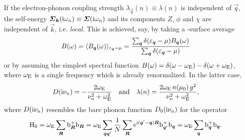If the electron-phonon coupling strength $\lambda_{\vec q}(n) \equiv \lambda(n)$
is independent of $\vec q$, the self-energy $\boldsymbol {\varSigma}_{\boldsymbol k}(\mathrm i \omega_n)
\equiv \boldsymbol {\varSigma}(\mathrm i \omega_n)$ and its components $Z$, $\phi$ and $\chi$ are
independent of $\vec k$, i.e. \emph{local}. This is achieved, say, by taking a
-surface average \cite[Eqs.~3.23, 3.24]{AllenMitrovic82}
%
\begin{equation*}
    B(\omega) = \langle B_{\boldsymbol q}(\omega)\rangle_{\varepsilon_{\boldsymbol q} = \mu}
    = \frac
        {\sum_{\boldsymbol q} \delta(\varepsilon_{\boldsymbol q} - \mu) B_{\boldsymbol q}(\omega)}
        {\sum_{\boldsymbol q} \delta(\varepsilon_{\boldsymbol q} - \mu)}
\end{equation*}
%
or by assuming the simplest spectral function $B(\omega) = \delta(\omega -
\omega \sb{\text{E}}) - \delta(\omega + \omega \sb{\text{E}})$, where $\omega \sb{\text{E}}$ is a
single  frequency which is already renormalized. In the latter
case,
%
\begin{equation*}
    D(\mathrm i \nu_n)
    = -\frac{2 \omega \sb{\text{E}}}{\nu_n^2 + \omega^2 \sb{\text{E}}}
    \quad \text{and} \quad
    \lambda(n)
    = \frac{2 \omega \sb{\text{E}} \, n(\mu_0) \, g^2}{\nu_n^2 + \omega^2 \sb{\text{E}}},
\end{equation*}
%
where $D(\mathrm i \nu_n)$ resembles the bare phonon  function $D_0(\mathrm i
\nu_n)$ for the  operator
%
\begin{equation*}
    \mathrm H_0
    = \omega \sb{\text{E}} \sum_{\boldsymbol R} \mathrm b_{\boldsymbol R}^+ \mathrm b_{\boldsymbol R}
    = \omega \sb{\text{E}} \sum_{\boldsymbol q \boldsymbol q'} \frac 1 N \sum_{\boldsymbol R}
        \mathrm e^{\mathrm i (\boldsymbol q' - \boldsymbol q) \boldsymbol R} \mathrm b_{\boldsymbol q'}^+ \mathrm b_{\boldsymbol q}
    = \omega \sb{\text{E}} \sum_{\boldsymbol q} \mathrm b_{\boldsymbol q}^+ \mathrm b_{\boldsymbol q}.
\end{equation*}

